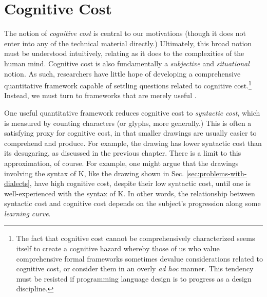 
\section{Cognitive Cost}\label{sec:syntactic-properties}
The notion of \emph{cognitive cost} is central to our motivations (though it does not enter into any of the technical material directly.) Ultimately, this broad notion must be understood intuitively, relating as it does to the complexities of the human mind. Cognitive cost is also fundamentally a \emph{subjective} and \emph{situational} notion. As such, researchers have little hope of developing a comprehensive quantitative framework capable of settling questions related to cognitive cost.\footnote{The fact that cognitive cost cannot be comprehensively characterized seems itself to create a cognitive hazard whereby those of us who value comprehensive formal frameworks sometimes devalue considerations related to cognitive cost, or consider them in an overly \emph{ad hoc} manner. This tendency must be resisted if programming language design is to progress as a design discipline.} Instead, we must turn to frameworks that are merely useful \cite{box1987empirical}. %

One useful quantitative framework reduces cognitive cost to \emph{syntactic cost}, which is measured by counting characters (or glyphs, more generally.) This is often a satisfying proxy for cognitive cost, in that smaller drawings are usually easier to comprehend and produce. For example, the drawing \li{[1, 2, 3, 4, 5]} has lower syntactic cost than its desugaring, as discussed in the previous chapter. There is a limit to this approximation, of course. For example, one might argue that the drawings involving the syntax of K, like the drawing shown in Sec. \ref{sec:problems-with-dialects}, have high cognitive cost, despite their low syntactic cost, until one is well-experienced with the syntax of K. In other words, the relationship between syntactic cost and cognitive cost depends on the subject's progression along some \emph{learning curve}.

